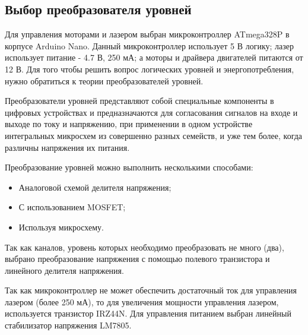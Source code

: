 \subsection{Выбор преобразователя уровней} 
Для управления моторами и лазером выбран микроконтроллер ATmega328P в корпусе Arduino Nano.
Данный микроконтроллер использует 5 В логику\cite{schemt_1}; лазер использует питание - 4.7 В, 250 мА; 
а моторы и драйвера двигателей питаются от 12 В. Для того чтобы решить вопрос логических уровней и энергопотребления,
нужно обратиться к теории преобразователей уровней.

Преобразователи уровней\cite{schemt_2} представляют собой специальные компоненты в цифровых устройствах и предназначаются для согласования 
сигналов на входе и выходе по току и напряжению, при применении в одном устройстве интегральных микросхем из совершенно разных 
семейств, и уже тем более, когда различны напряжения их питания.

Преобразование уровней можно выполнить несколькими способами:
\begin{itemize}
    \item Аналоговой схемой делителя напряжения;
    \item С использованием MOSFET;
    \item Используя микросхему.
\end{itemize}

Так как каналов, уровень которых необходимо преобразовать не много (два), выбрано преобразование напряжения с помощью полевого 
транзистора и линейного делителя напряжения. 

Так как микроконтроллер не может обеспечить достаточный ток для управления лазером (более 250 мА), то для увеличения
мощности управления лазером, используется транзистор IRZ44N. Для управления питанием выбран линейный стабилизатор
напряжения LM7805.
